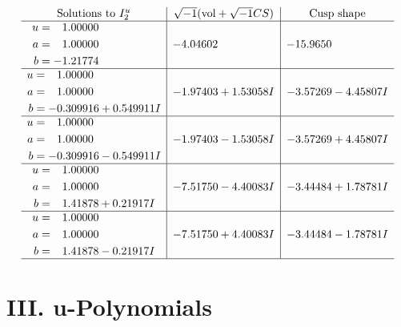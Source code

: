 \documentclass[1p]{elsarticle_modified}
\theoremstyle{definition}
\newcommand{\I}{\sqrt{-1}}
\begin{document}
$$\begin{array}{c|c|c}  
\text{Solutions to }I^u_{2}& \I (\text{vol} + \sqrt{-1}CS) & \text{Cusp shape}\\
 \hline 
\begin{aligned}
u &= \phantom{-}1.00000\phantom{ +0.000000I} \\
a &= \phantom{-}1.00000\phantom{ +0.000000I} \\
b &= -1.21774\phantom{ +0.000000I}\end{aligned}
 & -4.04602\phantom{ +0.000000I} & -15.9650\phantom{ +0.000000I} \\ \hline\begin{aligned}
u &= \phantom{-}1.00000\phantom{ +0.000000I} \\
a &= \phantom{-}1.00000\phantom{ +0.000000I} \\
b &= -0.309916 + 0.549911 I\end{aligned}
 & -1.97403 + 1.53058 I & -3.57269 - 4.45807 I \\ \hline\begin{aligned}
u &= \phantom{-}1.00000\phantom{ +0.000000I} \\
a &= \phantom{-}1.00000\phantom{ +0.000000I} \\
b &= -0.309916 - 0.549911 I\end{aligned}
 & -1.97403 - 1.53058 I & -3.57269 + 4.45807 I \\ \hline\begin{aligned}
u &= \phantom{-}1.00000\phantom{ +0.000000I} \\
a &= \phantom{-}1.00000\phantom{ +0.000000I} \\
b &= \phantom{-}1.41878 + 0.21917 I\end{aligned}
 & -7.51750 - 4.40083 I & -3.44484 + 1.78781 I \\ \hline\begin{aligned}
u &= \phantom{-}1.00000\phantom{ +0.000000I} \\
a &= \phantom{-}1.00000\phantom{ +0.000000I} \\
b &= \phantom{-}1.41878 - 0.21917 I\end{aligned}
 & -7.51750 + 4.40083 I & -3.44484 - 1.78781 I\\
 \hline 
 \end{array}$$\newpage
\newpage\renewcommand{\arraystretch}{1}
\centering \section*{ III. u-Polynomials}
\end{document}
